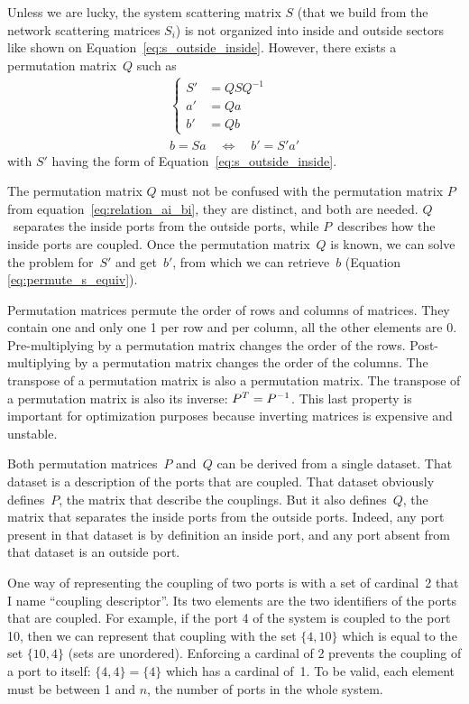 Unless we are lucky, the system scattering matrix $S$ (that we build from the network scattering matrices $S_i$) is not organized into inside and outside sectors like shown on Equation~\eqref{eq:s_outside_inside}.
However, there exists a permutation matrix~$Q$ such as
\begin{gather}
    \left\lbrace
    \begin{aligned}
        S' &= Q S Q^{-1} \\
        a' &= Q a \\
        b' &= Q b
    \end{aligned}
    \right.
    \label{eq:permute_s}
    \\
    b = S a \quad \Longleftrightarrow \quad b' = S' a' \label{eq:permute_s_equiv}
\end{gather}
with $S'$ having the form of Equation~\eqref{eq:s_outside_inside}.

The permutation matrix $Q$ must not be confused with the permutation matrix $P$ from equation~\eqref{eq:relation_ai_bi}, they are distinct, and both are needed.
$Q$~separates the inside ports from the outside ports, while $P$~describes how the inside ports are coupled.
Once the permutation matrix~$Q$ is known, we can solve the problem for~$S'$ and get~$b'$, from which we can retrieve~$b$ (Equation \eqref{eq:permute_s_equiv}).

Permutation matrices permute the order of rows and columns of matrices.
They contain one and only one 1 per row and per column, all the other elements are 0.
Pre-multiplying by a permutation matrix changes the order of the rows.
Post-multiplying by a permutation matrix changes the order of the columns.
The transpose of a permutation matrix is also a permutation matrix.
The transpose of a permutation matrix is also its inverse: $P^T = P^{-1}$.
This last property is important for optimization purposes because inverting matrices is expensive and unstable.

Both permutation matrices~$P$ and~$Q$ can be derived from a single dataset.
That dataset is a description of the ports that are coupled.
That dataset obviously defines~$P$, the matrix that describe the couplings.
But it also defines~$Q$, the matrix that separates the inside ports from the outside ports.
Indeed, any port present in that dataset is by definition an inside port, and any port absent from that dataset is an outside port.

One way of representing the coupling of two ports is with a set of cardinal~2 that I name ``coupling descriptor''.
Its two elements are the two identifiers of the ports that are coupled.
For example, if the port 4 of the system is coupled to the port 10, then we can represent that coupling with the set $\lbrace 4, 10\rbrace$ which is equal to the set $\lbrace 10, 4\rbrace$ (sets are unordered).
Enforcing a cardinal of 2 prevents the coupling of a port to itself: $\lbrace 4, 4\rbrace = \lbrace 4\rbrace$ which has a cardinal of~1.
To be valid, each element must be between 1 and $n$, the number of ports in the whole system.

